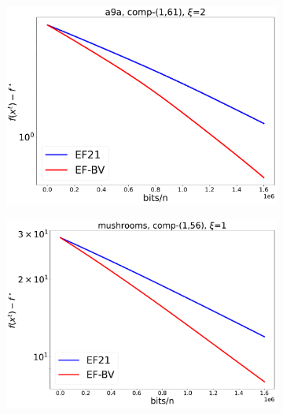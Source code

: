 \documentclass{article} %
\theoremstyle{plain}
\theoremstyle{definition}
\theoremstyle{remark}
\begin{document}
\begin{figure}[!htbp]
\begin{subfigure}[b]{0.32\textwidth}
      \includegraphics[width=\textwidth]{img/a9a/CompK_61_1_a9a_8124workers_3000K_32561_a9a_61_1_1_2_logreg_diff_nonconv.pdf}
   \end{subfigure}
   \hfill
   \begin{subfigure}[b]{0.32\textwidth}
      \centering
      \includegraphics[width=\textwidth]{img/mushrooms/CompK_56_1_mushrooms_8124workers_3000K_8124_mushrooms_56_1_1_1_logreg_diff_nonconv.pdf}
   \end{subfigure}
   \hfill
   \begin{subfigure}[b]{0.32\textwidth}
      \centering

\end{subfigure}
\end{figure}
\end{document}
